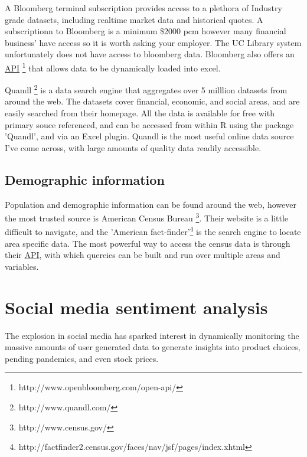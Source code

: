 \documentclass[11pt]{article}
\begin{document}
	A Bloomberg terminal subscription provides access to a plethora of Industry grade datasets, including realtime market data and historical quotes.
	A subscriptionn to Bloomberg is a minimum \$2000 pcm however many financial business' have access so it is worth asking your employer.
	The UC Library system unfortunately does not have access to bloomberg data.
	Bloomberg also offers an \hyperref[api]{API} \footnote{http://www.openbloomberg.com/open-api/} that allows data to be dynamically loaded into excel.

	Quandl \footnote{http://www.quandl.com/} is a data search engine that aggregates over 5 milllion datasets from around the web.
	The datasets cover financial, economic, and social areas, and are easily searched from their homepage.
	All the data is available for free with primary souce referenced, and can be accessed from within R using the package 'Quandl', and via an Excel plugin. 
	Quandl is the most useful online data source I've come across, with large amounts of quality data readily accessible.

	
	\subsection{Demographic information}

	Population and demographic information can be found around the web, however the most trusted source is American Census Bureau \footnote{http://www.census.gov/}.
	Their website is a little difficult to navigate, and the 'American fact-finder'\footnote{http://factfinder2.census.gov/faces/nav/jsf/pages/index.xhtml} is the search engine to locate area specific data.
	The most powerful way to access the census data is through their \hyperref[api]{API}, with which quereies can be built and run over multiple areas and variables.


\section{Social media sentiment analysis}
	The explosion in social media has sparked interest in dynamically monitoring the massive amounts of user generated data to generate insights into product choices, pending pandemics, and even stock prices.
\end{document}
